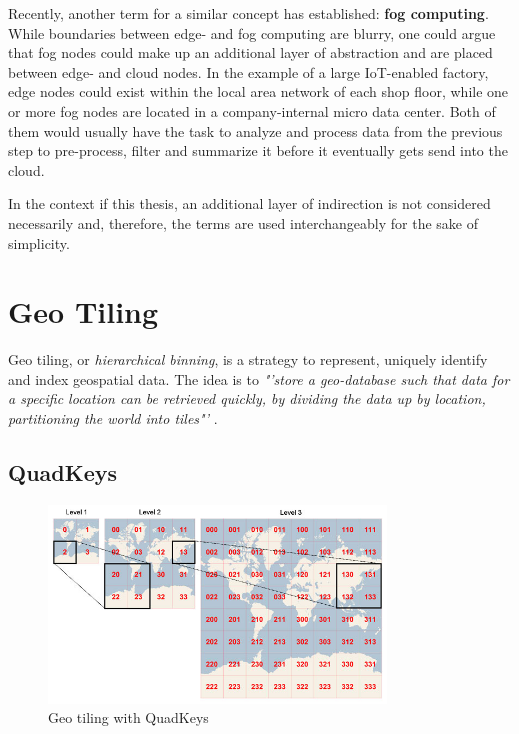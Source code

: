 Recently, another term for a similar concept has established: \textbf{fog computing}. While boundaries between edge- and fog computing are blurry, one could argue that fog nodes could make up an additional layer of abstraction and are placed between edge- and cloud nodes. In the example of a large IoT-enabled factory, edge nodes could exist within the local area network of each shop floor, while one or more fog nodes are located in a company-internal micro data center. Both of them would usually have the task to analyze and process data from the previous step to pre-process, filter and summarize it before it eventually gets send into the cloud.

In the context if this thesis, an additional layer of indirection is not considered necessarily and, therefore, the terms are used interchangeably for the sake of simplicity. 

\section{Geo Tiling}
\label{sec:background:geo_tiling}
Geo tiling, or \textit{hierarchical binning}, is a strategy to represent, uniquely identify and index geospatial data. The idea is to \textit{"'store a geo-database such that data for a specific location can be retrieved quickly, by dividing the data up by location, partitioning the world into tiles"'} \cite{wiki:quadtiles}. 

\subsection{QuadKeys}
\label{subsec:background:quadkeys}

\begin{figure}[H]
	\centering
	\includegraphics[width=0.8\textwidth]{98_images/quadkeys.jpg}
	\caption[Geo tiling with QuadKeys]{Geo tiling with QuadKeys \cite{wiki:quadtiles}}
	\label{fig:quadkeys}
\end{figure}


